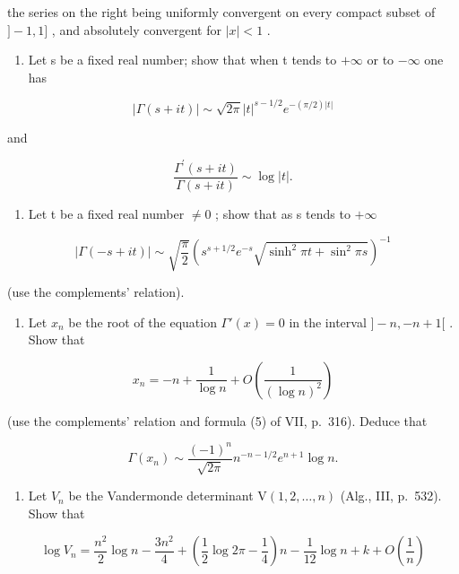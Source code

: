 the series on the right being uniformly convergent on every compact subset of \(]-1,1]\) , and absolutely convergent for \(|x|<1\) .

\begin{enumerate}
\def\labelenumi{\arabic{enumi})}
\setcounter{enumi}{2}
\tightlist
\item
  Let s be a fixed real number; show that when t tends to \(+\infty\) or to \(-\infty\) one has
\end{enumerate}

\[
| \Gamma (s + i t) | \sim \sqrt {2 \pi} | t | ^ {s - 1 / 2} e ^ {- (\pi / 2) | t |}
\]

and

\[
\frac {\Gamma^ {\prime} (s + i t)}{\Gamma (s + i t)} \sim \log | t |.
\]

\begin{enumerate}
\def\labelenumi{\arabic{enumi})}
\setcounter{enumi}{3}
\tightlist
\item
  Let t be a fixed real number \(\neq 0\) ; show that as s tends to \(+\infty\)
\end{enumerate}

\[
| \Gamma (- s + i t) | \sim \sqrt {\frac {\pi}{2}} \left(s ^ {s + 1 / 2} e ^ {- s} \sqrt {\sinh^ {2} \pi t + \sin^ {2} \pi s}\right) ^ {- 1}
\]

(use the complements' relation).

\begin{enumerate}
\def\labelenumi{\arabic{enumi})}
\setcounter{enumi}{4}
\tightlist
\item
  Let \(x_{n}\) be the root of the equation \(\Gamma'(x) = 0\) in the interval \(] - n, -n + 1[\) . Show that
\end{enumerate}

\[
x _ {n} = - n + \frac {1}{\log n} + O \left(\frac {1}{(\log n) ^ {2}}\right)
\]

(use the complements' relation and formula (5) of VII, p.~316). Deduce that

\[
\Gamma (x _ {n}) \sim \frac {(- 1) ^ {n}}{\sqrt {2 \pi}} n ^ {- n - 1 / 2} e ^ {n + 1} \log n.
\]

\begin{enumerate}
\def\labelenumi{\arabic{enumi})}
\setcounter{enumi}{5}
\tightlist
\item
  Let \(V_{n}\) be the Vandermonde determinant \(\mathrm{V}(1,2,\dots,n)\) (Alg., III, p.~532). Show that
\end{enumerate}

\[
\log V _ {n} = \frac {n ^ {2}}{2} \log n - \frac {3 n ^ {2}}{4} + \left(\frac {1}{2} \log 2 \pi - \frac {1}{4}\right) n - \frac {1}{12} \log n + k + O \left(\frac {1}{n}\right)
\]

